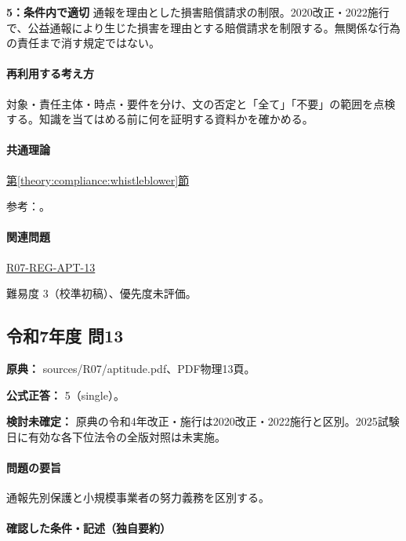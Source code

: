 \noindent\textbf{5：条件内で適切} 通報を理由とした損害賠償請求の制限。2020改正・2022施行で、公益通報により生じた損害を理由とする賠償請求を制限する。無関係な行為の責任まで消す規定ではない。\par

\paragraph{再利用する考え方} 対象・責任主体・時点・要件を分け、文の否定と「全て」「不要」の範囲を点検する。知識を当てはめる前に何を証明する資料かを確かめる。

\paragraph{共通理論} \hyperref[theory:compliance:whistleblower]{第\ref*{theory:compliance:whistleblower}節}

\par 参考：\cite{caa_amend2020,caa_current_faq,saf53_whistle_oldpublic}。

\paragraph{関連問題} \hyperref[q:r07-reg-apt-13]{R07-REG-APT-13}

\par 難易度 3（校準初稿）、優先度未評価。

\subsection{令和7年度 問13}
\label{q:r07-reg-apt-13}

\noindent\textbf{原典：} sources/R07/aptitude.pdf、PDF物理13頁。

\textbf{公式正答：} 5（single）。

\par\textbf{検討未確定：} 原典の令和4年改正・施行は2020改正・2022施行と区別。2025試験日に有効な各下位法令の全版対照は未実施。

\paragraph{問題の要旨} 通報先別保護と小規模事業者の努力義務を区別する。

\paragraph{確認した条件・記述（独自要約）}\mbox{}\par

